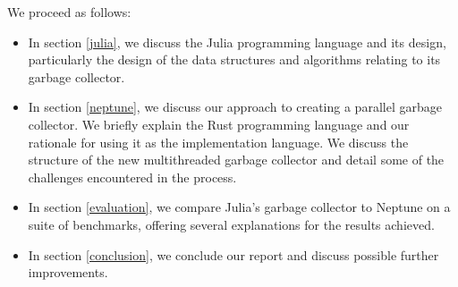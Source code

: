 We proceed as follows:
\begin{itemize}
  \item In section \ref{julia}, we discuss the Julia programming language and its design, particularly the design of the data structures and algorithms relating to its garbage collector. \vspace{-0.6em}
  \item In section \ref{neptune}, we discuss our approach to creating a parallel garbage collector. We briefly explain the Rust programming language and our rationale for using it as the implementation language. We discuss the structure of the new multithreaded garbage collector and detail some of the challenges encountered in the process. \vspace{-0.6em}
  \item In section \ref{evaluation}, we compare Julia's garbage collector to Neptune on a suite of benchmarks, offering several explanations for the results achieved. \vspace{-0.6em}
  \item In section \ref{conclusion}, we conclude our report and discuss possible further improvements.
\end{itemize}

